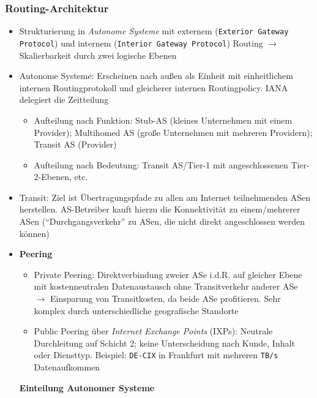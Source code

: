 \subsubsection{Routing-Architektur}
\begin{itemize}
	\item Strukturierung in \textit{Autonome Systeme} mit externem (\texttt{Exterior Gateway Protocol}) und internem (\texttt{Interior Gateway Protocol}) Routing \(\rightarrow\) Skalierbarkeit durch zwei logische Ebenen
	\item Autonome Systeme: Erscheinen nach außen als Einheit mit einheitlichem internen Routingprotokoll und gleicherer internen Routingpolicy. IANA delegiert die Zeitteilung
	\begin{itemize}
		\item Aufteilung nach Funktion: Stub-AS (kleines Unternehmen mit einem Provider); Multihomed AS (große Unternehmen mit mehreren Providern); Transit AS (Provider)
		\item Aufteilung nach Bedeutung: Transit AS/Tier-1 mit angeschlossenen Tier-2-Ebenen, etc.
	\end{itemize}
	\item Transit: Ziel ist Übertragungspfade zu allen am Internet teilnehmenden ASen herstellen. AS-Betreiber kauft hierzu die Konnektivität zu einem/mehrerer ASen ("`Durchgangsverkehr"' zu ASen, die nicht direkt angeschlossen werden können)
	\item \textbf{Peering}
	\begin{itemize}
		\item Private Peering: Direktverbindung zweier ASe i.d.R. auf gleicher Ebene mit kostenneutralen Datenaustausch ohne Transitverkehr anderer ASe \(\rightarrow\) Einsparung von Transitkosten, da beide ASe profitieren. Sehr komplex durch unterschiedliche geografische Standorte
		\item Public Peering über \textit{Internet Exchange Points} (IXPs): Neutrale Durchleitung auf Schicht 2; keine Unterscheidung nach Kunde, Inhalt oder Diensttyp. Beispiel: \texttt{DE-CIX} in Frankfurt mit mehreren \texttt{TB/s} Datenaufkommen
	\end{itemize}
	\textbf{Einteilung Autonomer Systeme}
\end{itemize}

